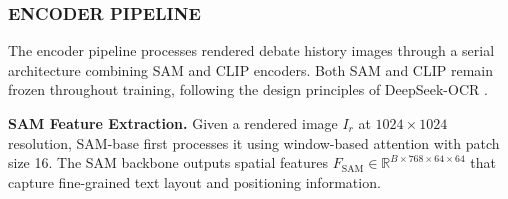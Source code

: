\documentclass{article}
\theoremstyle{plain}
\theoremstyle{definition}
\theoremstyle{remark}
\begin{document}






\subsubsection{ENCODER PIPELINE}

The encoder pipeline processes rendered debate history images through a serial architecture 
combining SAM and CLIP encoders. Both SAM and CLIP remain frozen 
throughout training, following the design principles of DeepSeek-OCR \cite{wei2025deepseek}.

\textbf{SAM Feature Extraction.} Given a rendered image $I_r$ at $1024 \times 1024$ 
resolution, SAM-base first processes it using window-based attention with patch size 16. 
The SAM backbone outputs spatial features $F_{\text{SAM}} \in \mathbb{R}^{B \times 768 \times 64 \times 64}$ 
that capture fine-grained text layout and positioning information.
\end{document}
